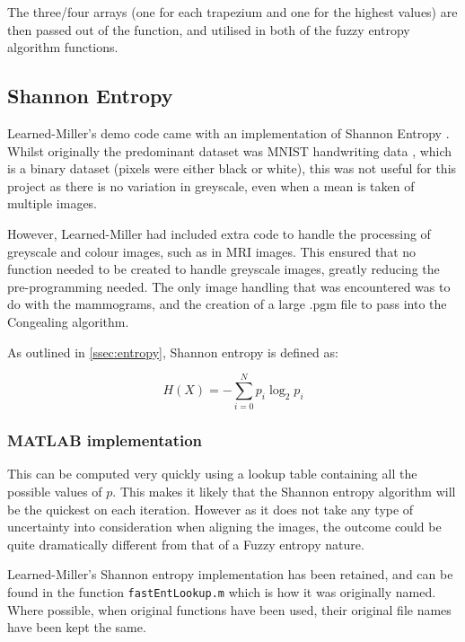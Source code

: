 The three/four arrays (one for each trapezium and one for the highest values) are then passed out of the function, and utilised in both of the fuzzy entropy algorithm functions.

\newpage
\subsection{Shannon Entropy}
\label{ssec:shannon-entropy}

Learned-Miller's demo code came with an implementation of Shannon Entropy \cite{joint-alignment}. Whilst originally the predominant dataset was MNIST handwriting data \cite{lecun1998gradientbased}, which is a binary dataset (pixels were either black or white), this was not useful for this project as there is no variation in greyscale, even when a mean is taken of multiple images.

However, Learned-Miller had included extra code to handle the processing of greyscale and colour images, such as in MRI images. This ensured that no function needed to be created to handle greyscale images, greatly reducing the pre-programming needed. The only image handling that was encountered was to do with the mammograms, and the creation of a large .pgm file to pass into the \Gls{Congealing} algorithm.

As outlined in \ref{ssec:entropy}, Shannon entropy is defined as:

\begin{equation}
  H(X) = - \displaystyle\sum_{i=0}^{N}{p_i \log_2 p_i}
\end{equation}

\subsubsection{MATLAB implementation}

This can be computed very quickly using a lookup table containing all the possible values of $p$. This makes it likely that the Shannon entropy algorithm will be the quickest on each iteration. However as it does not take any type of uncertainty into consideration when aligning the images, the outcome could be quite dramatically different from that of a Fuzzy entropy nature.

Learned-Miller's Shannon entropy implementation has been retained, and can be found in the function \texttt{fastEntLookup.m} which is how it was originally named. Where possible, when original functions have been used, their original file names have been kept the same.

